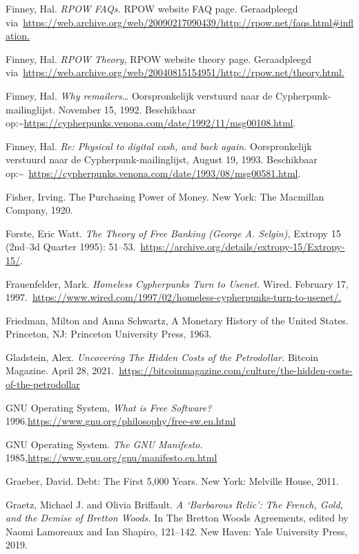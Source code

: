\documentclass[smalldemyvopaper,11pt,twoside,onecolumn,openright,extrafontsizes,hidelinks]{memoir}
\begin{document}
Finney, Hal. \emph{RPOW FAQs.} RPOW website FAQ page. Geraadpleegd
via~\href{https://nakamotoinstitute.org/rpow/}{https://web.archive.org/web/20090217090439/http://rpow.net/faqs.html\#inflation.}

Finney, Hal. \emph{RPOW Theory,} RPOW website theory page. Geraadpleegd
via~\href{https://nakamotoinstitute.org/finney/rpow/theory.html}{https://web.archive.org/web/20040815154951/http://rpow.net/theory.html.}

Finney, Hal. \emph{Why remailers\ldots{}} Oorspronkelijk verstuurd naar
de Cypherpunk-mailinglijst. November 15, 1992. Beschikbaar
op:\textasciitilde{}\url{https://cypherpunks.venona.com/date/1992/11/msg00108.html}.

Finney, Hal. \emph{Re: Physical to digital cash, and back again.}
Oorspronkelijk verstuurd naar de Cypherpunk-mailinglijst, August 19,
1993. Beschikbaar
op:\textasciitilde~\url{https://cypherpunks.venona.com/date/1993/08/msg00581.html}.

Fisher, Irving. The Purchasing Power of Money. New York: The Macmillan
Company, 1920.

Forste, Eric Watt. \emph{The Theory of Free Banking (George A. Selgin),}
Extropy 15 (2nd--3d Quarter 1995):
51--53.~\url{https://archive.org/details/extropy-15/Extropy-15/}.

Frauenfelder, Mark. \emph{Homeless Cypherpunks Turn to Usenet.} Wired.
February 17,
1997.~\href{https://www.wired.com/1997/02/homeless-cypherpunks-turn-to-usenet/}{https://www.wired.com/1997/02/homeless-cypherpunks-turn-to-usenet/.}

Friedman, Milton and Anna Schwartz, A Monetary History of the United
States. Princeton, NJ: Princeton University Press, 1963.

Gladstein, Alex. \emph{Uncovering The Hidden Costs of the Petrodollar.}
Bitcoin Magazine. April 28,
2021.~\url{https://bitcoinmagazine.com/culture/the-hidden-costs-of-the-petrodollar}

GNU Operating System, \emph{What is Free Software?}
1996.\url{https://www.gnu.org/philosophy/free-sw.en.html}

GNU Operating System. \emph{The GNU Manifesto.}
1985,\url{https://www.gnu.org/gnu/manifesto.en.html}

Graeber, David. Debt: The First 5,000 Years. New York: Melville House,
2011.

Graetz, Michael J. and Olivia Briffault. \emph{A `Barbarous Relic': The
French, Gold, and the Demise of Bretton Woods.} In The Bretton Woods
Agreements, edited by Naomi Lamoreaux and Ian Shapiro, 121--142. New
Haven: Yale University Press, 2019.
\end{document}
